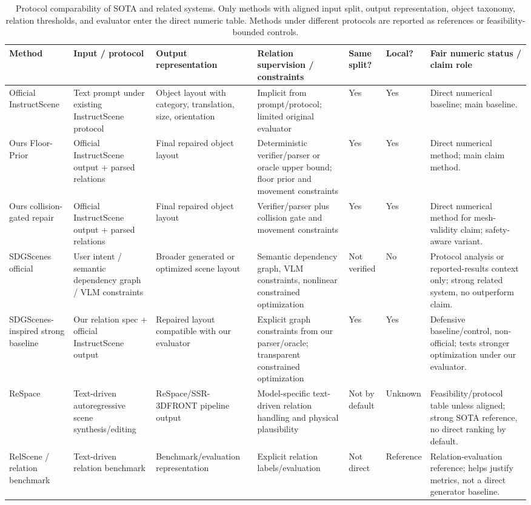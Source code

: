 \begin{table}[t]
\centering
\scriptsize
\caption{Protocol comparability of SOTA and related systems. Only methods with aligned input split, output representation, object taxonomy, relation thresholds, and evaluator enter the direct numeric table. Methods under different protocols are reported as references or feasibility-bounded controls.}
\label{tab:sota_protocol_comparison}
\begin{tabularx}{\textwidth}{p{2.4cm}X X X p{1.3cm} p{1.4cm} X}
\toprule
Method & Input / protocol & Output representation & Relation supervision / constraints & Same split? & Local? & Fair numeric status / claim role \\
\midrule
Official InstructScene & Text prompt under existing InstructScene protocol & Object layout with category, translation, size, orientation & Implicit from prompt/protocol; limited original evaluator & Yes & Yes & Direct numerical baseline; main baseline. \\
Ours Floor-Prior & Official InstructScene output + parsed relations & Final repaired object layout & Deterministic verifier/parser or oracle upper bound; floor prior and movement constraints & Yes & Yes & Direct numerical method; main claim method. \\
Ours collision-gated repair & Official InstructScene output + parsed relations & Final repaired object layout & Verifier/parser plus collision gate and movement constraints & Yes & Yes & Direct numerical method for mesh-validity claim; safety-aware variant. \\
SDGScenes official & User intent / semantic dependency graph / VLM constraints & Broader generated or optimized scene layout & Semantic dependency graph, VLM constraints, nonlinear constrained optimization & Not verified & No & Protocol analysis or reported-results context only; strong related system, no outperform claim. \\
SDGScenes-inspired strong baseline & Our relation spec + official InstructScene output & Repaired layout compatible with our evaluator & Explicit graph constraints from our parser/oracle; transparent constrained optimization & Yes & Yes & Defensive baseline/control, non-official; tests stronger optimization under our evaluator. \\
ReSpace & Text-driven autoregressive scene synthesis/editing & ReSpace/SSR-3DFRONT pipeline output & Model-specific text-driven relation handling and physical plausibility & Not by default & Unknown & Feasibility/protocol table unless aligned; strong SOTA reference, no direct ranking by default. \\
RelScene / relation benchmark & Text-driven relation benchmark & Benchmark/evaluation representation & Explicit relation labels/evaluation & Not direct & Reference & Relation-evaluation reference; helps justify metrics, not a direct generator baseline. \\
\bottomrule
\end{tabularx}
\end{table}

